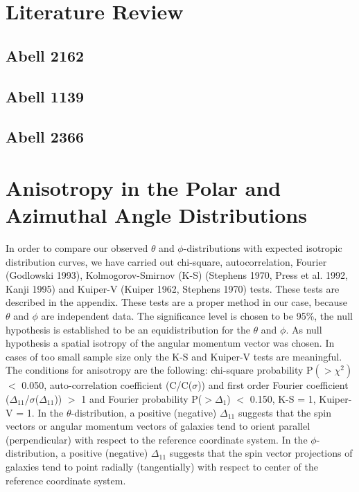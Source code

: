 \section{Literature Review}
\subsection{Abell 2162}

\subsection{Abell 1139}

\subsection{Abell 2366}

\section{Anisotropy in the Polar and Azimuthal Angle Distributions}
In order to compare our observed
$\theta$ and $\phi$-distributions with expected isotropic
distribution curves, we have carried out chi-square,
autocorrelation, Fourier (Godlowski 1993), Kolmogorov-Smirnov
(K-S) (Stephens 1970, Press et al. 1992, Kanji 1995) and Kuiper-V
(Kuiper 1962, Stephens 1970) tests. 
These tests are described in the appendix. These tests are a proper method in our
case, because $\theta$ and $\phi$ are independent data. The
significance level is chosen to be 95\%, the null hypothesis is
established to be an equidistribution for the $\theta$ and $\phi$.
As null hypothesis a spatial isotropy of the angular momentum
vector was chosen. In cases of too small sample size only the K-S
and Kuiper-V tests are meaningful. The conditions for anisotropy
are the following: chi-square probability P$(>\chi^2)$ $<$ 0.050,
auto-correlation coefficient (C/C($\sigma$)) and first order
Fourier coefficient ($\Delta_{11}$/$\sigma$($\Delta_{11}$)) $>$ 1
and Fourier probability P($>\Delta_1$) $<$ 0.150, K-S = 1,
Kuiper-V = 1. In the $\theta$-distribution, a positive (negative)
$\Delta_{11}$ suggests that the spin vectors or angular momentum
vectors of galaxies tend to orient parallel (perpendicular) with
respect to the reference coordinate system. In the
$\phi$-distribution, a positive (negative) $\Delta_{11}$ suggests
that the spin vector projections of galaxies tend to point
radially (tangentially) with respect to center of the reference
coordinate system.
